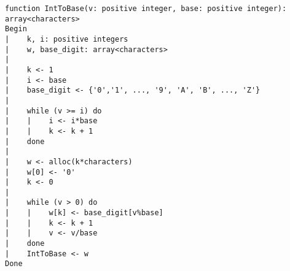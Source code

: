 \begin{lstlisting}[breaklines]
function IntToBase(v: positive integer, base: positive integer): array<characters>
Begin
|    k, i: positive integers
|    w, base_digit: array<characters>
|
|    k <- 1
|    i <- base
|    base_digit <- {'0','1', ..., '9', 'A', 'B', ..., 'Z'}
|    
|    while (v >= i) do
|    |    i <- i*base
|    |    k <- k + 1
|    done
|
|    w <- alloc(k*characters)
|    w[0] <- '0'
|    k <- 0
|
|    while (v > 0) do
|    |    w[k] <- base_digit[v%base]
|    |    k <- k + 1
|    |    v <- v/base
|    done
|    IntToBase <- w
Done
\end{lstlisting}
